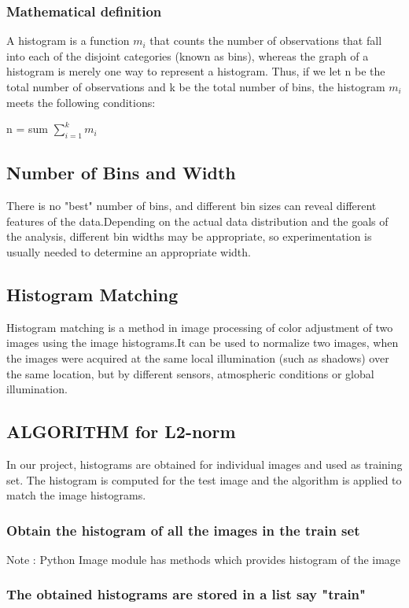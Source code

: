\documentclass[10pt,a4paper]{article}
\begin{document}
\subsubsection{Mathematical definition}
A histogram is a function $m_i$ that counts the number of observations that fall into each of the disjoint categories (known as bins), whereas the graph of a histogram is merely one way to represent a histogram. Thus, if we let n be the total number of observations and k be the total number of bins, the histogram $m_i$ meets the following conditions:

    n = sum $\displaystyle\sum\limits_{i=1}^k m_i$ 
  
\subsection{Number of  Bins and Width}
There is no "best" number of bins, and different bin sizes can reveal different features of the data.Depending on the actual data distribution and the goals of the analysis, different bin widths may be appropriate, so experimentation is usually needed to determine an appropriate width.
   
\subsection{Histogram Matching}
Histogram matching is a method in image processing of color adjustment of two images using the image histograms.It can be used to normalize two images, when the images were acquired at the same local illumination (such as shadows) over the same location, but by different sensors, atmospheric conditions or global illumination.

\subsection{ALGORITHM for L2-norm}
In our project, histograms are obtained for individual images and used as training set. The histogram is computed for the test image and the algorithm is applied to match the image histograms.
\subsubsection{Obtain the histogram of all the images in the train set
}
Note : Python Image module has methods which provides histogram of the image \\

\subsubsection{The obtained histograms are stored in a list say "train"}
\end{document}
